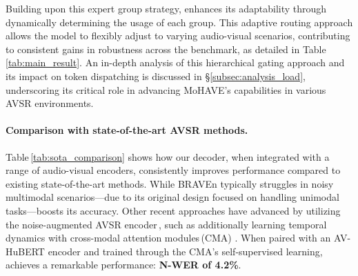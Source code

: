 Building upon this expert group strategy, \ourmodel enhances its adaptability through dynamically determining the usage of each group. This adaptive routing approach allows the model to flexibly adjust to varying audio-visual scenarios, contributing to consistent gains in robustness across the benchmark, as detailed in Table\,\ref{tab:main_result}.
An in-depth analysis of this hierarchical gating approach and its impact on token dispatching is discussed in \S\ref{subsec:analysis_load}, underscoring its critical role in advancing MoHAVE’s capabilities in various AVSR environments.


\vspace*{-12pt}
\paragraph{Comparison with state-of-the-art AVSR methods.}
Table\,\ref{tab:sota_comparison} shows how our \ourmodel decoder, when integrated with a range of audio-visual encoders, consistently improves performance compared to existing state-of-the-art methods. While BRAVEn \citep{haliassos2024braven} typically struggles in noisy multimodal scenarios---due to its original design focused on handling unimodal tasks---\ourmodel boosts its accuracy. Other recent approaches have advanced by utilizing the noise-augmented AVSR encoder\,\citep{shi2022learning}, such as additionally learning temporal dynamics with cross-modal attention modules\,(CMA) \citep{kim2024learning}. When paired with an AV-HuBERT encoder and trained through the CMA's self-supervised learning, \ourmodel achieves a remarkable performance: \textbf{N-WER of 4.2\%}.
